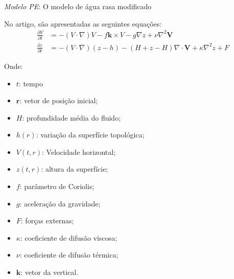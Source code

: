 \begin{frame}{\textit{Modelo PE}: O modelo de água rasa modificado}
	\begin{small}
		No artigo, são apresentadas as seguintes equações:
		\begin{align}
			\frac{\partial V}{\partial t} & = - ( V \cdot \nabla)V - f \mathbf{k} \times V - g \nabla z + \nu \nabla^2\mathbf{V} \label{eq:agua-rasa-modificada-1}     \\
			\frac{\partial z}{\partial t} & = - (V \cdot \nabla)(z - h) - (H + z - H)\nabla \cdot \mathbf{V} + \kappa \nabla^2 z + F \label{eq:agua-rasa-modificada-2} 
		\end{align}
	\end{small}
	\begin{scriptsize}
		Onde:
		\begin{multicols}{2}
			\begin{itemize}
				\item $t$: tempo
				\item $\mathbf{r}$: vetor de posição inicial;
				\item $H$: profundidade média do fluido;
				\item $h(r)$: variação da superfície topológica;
				\item $V(t,r)$: Velocidade horizontal;
				\item $z(t,r)$: altura da superfície;
				\item $f$: parâmetro de Coriolis;
				\item $g$: aceleração da gravidade;
				\item $F$: forças externas;
				\item $\kappa$: coeficiente de difusão viscosa;
				\item $\nu$: coeficiente de difusão térmica;
				\item $\mathbf{k}$: vetor da vertical.
			\end{itemize}
		\end{multicols}
	\end{scriptsize}
\end{frame}



